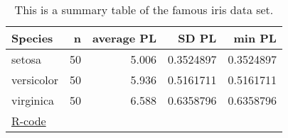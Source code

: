 \begin{table}

\caption{\label{tab:}This is a summary table of the famous iris data set.}
\centering
\begin{tabular}[t]{lrrrr}
\toprule
Species & n & average PL & SD PL & min PL\\
\midrule
setosa & 50 & 5.006 & 0.3524897 & 0.3524897\\
versicolor & 50 & 5.936 & 0.5161711 & 0.5161711\\
virginica & 50 & 6.588 & 0.6358796 & 0.6358796\\
\bottomrule
\multicolumn{5}{l}{\href{https://github.com/TobiasRoth/RtoAuthorea/blob/master/tables/latex_table/latex_table.R}{R-code}}\\
\end{tabular}
\end{table}
